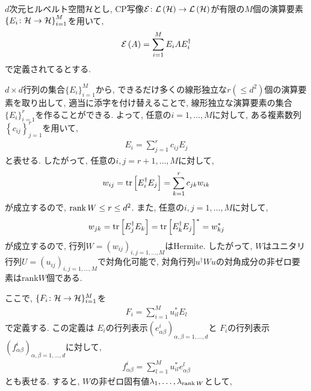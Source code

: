 \begin{ex}
    \label{ex8.10}
    $d$次元ヒルベルト空間$\mathcal{H}$とし, CP写像$\mathcal{E} \colon \mathcal{L}\left({\mathcal{H}}\right) \to \mathcal{L}\left({\mathcal{H}}\right)$が有限の$M$個の演算要素$\left\{ E_i \colon \mathcal{H} \to \mathcal{H} \right\}_{i = 1}^{M}$を用いて,
    \begin{align*}
        \mathcal{E} \left( A\right) = \sum_{i=1}^M E_i A E_i^\dagger
    \end{align*}
    で定義されてるとする.
    \par
    $d \times d$行列の集合$\{E_i\}_{i=1}^{M}$から, できるだけ多くの線形独立な$r \left(\le d^2\right)$個の演算要素を取り出して, 適当に添字を付け替えることで, 線形独立な演算要素の集合$\{E_i\}_{i=1}^{r}$を作ることができる.
    よって, 任意の$i= 1, \dots , M$に対して, ある複素数列$\left\{ c_{ij} \right\}_{j=1}^{r}$を用いて,
    \begin{align*}
        E_i = \sum_{j=1}^{r} c_{ij} E_j
    \end{align*}
    と表せる.
    したがって, 任意の$i, j = r+1 , \dots, M$に対して,
    \begin{align*}
        w_{ij} = \mathrm{tr}\left[E_i^\dagger E_j\right] = \sum_{k=1}^{r} c_{jk} w_{ik}
    \end{align*}
    が成立するので, $\operatorname{rank} W \leq r \leq d^2$.
    また, 任意の$i, j = 1 , \dots, M$に対して,
    \begin{align*}
        w_{jk} = \mathrm{tr}\left[ E_j^\dagger E_k\right]= \mathrm{tr}\left[ E_k^\dagger E_j\right]^*
        = w_{kj}^*
    \end{align*}
    が成立するので, 行列$W = \left(w_{ij}\right)_{i,j = 1, \dots , M}$はHermite.  したがって, $W$はユニタリ行列$U = \left(u_{ij}\right)_{i,j = 1, \dots , M}$で対角化可能で, 対角行列$u^\dagger W u$の対角成分の非ゼロ要素は$\mathrm{rank}W$個である.
    \par
    ここで, $\{F_i \colon \mathcal{H} \to \mathcal{H} \}_{i=1}^{M}$を
    \begin{align*}
        F_i = \sum_{i=1}^{M} u_{il}^{*} E_l
    \end{align*}
    で定義する. この定義は
    $E_{i}$の行列表示$\left( e^{i}_{\alpha \beta} \right)_{\alpha, \beta=1,\dots,d}$と
    $F_{i}$の行列表示$\left( f^{i}_{\alpha \beta} \right)_{\alpha, \beta=1,\dots,d}$に対して,
    \begin{align*}
        f_{\alpha \beta}^{i} = \sum_{l = 1}^M u_{il}^* e^l_{\alpha \beta}
    \end{align*}
    とも表せる.
    すると, $W$の非ゼロ固有値$\lambda_1, \dots , \lambda_{\operatorname{rank} W}$として,

\end{ex}
